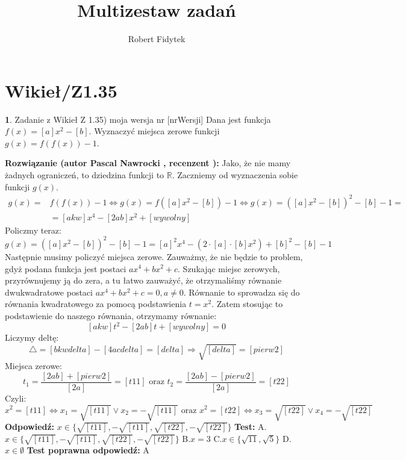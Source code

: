 \documentclass[12pt, a4paper]{article}
\title{Multizestaw zadań}
\author{Robert Fidytek}
\date{}
\theoremstyle{definition} %
\newtheorem{zad}{}
\newcommand{\kategoria}[1]{\section{#1}} %
\newcommand{\zadStart}[1]{\begin{zad}#1\newline} %
\newcommand{\zadStop}{\end{zad}}   %
\newcommand{\rozwStart}[2]{\noindent \textbf{Rozwiązanie (autor #1 , recenzent #2): }\newline} %
\newcommand{\rozwStop}{\newline}                                            %
\newcommand{\odpStart}{\noindent \textbf{Odpowiedź:}\newline}    %
\newcommand{\odpStop}{\newline}                                             %
\newcommand{\testStart}{\noindent \textbf{Test:}\newline} %
\newcommand{\testStop}{\newline} %
\newcommand{\kluczStart}{\noindent \textbf{Test poprawna odpowiedź:}\newline} %
\newcommand{\kluczStop}{\newline} %
\begin{document}
\maketitle


\kategoria{Wikieł/Z1.35}
\zadStart{Zadanie z Wikieł Z 1.35) moja wersja nr [nrWersji]}
Dana jest funkcja $f(x)=[a]x^2-[b]$.
Wyznaczyć miejsca zerowe funkcji \mbox{$g(x)=f(f(x))-1$}.
\zadStop
\rozwStart{Pascal Nawrocki}{}
Jako, że nie mamy żadnych ograniczeń, to dziedzina funkcji to $\mathbb{R}$.
Zaczniemy od wyznaczenia sobie funkcji $g(x)$.
\begin{equation}
\begin{split}
g(x)=&f(f(x))-1 \Leftrightarrow g(x)=f([a]x^2-[b])-1 \Leftrightarrow g(x)=([a]x^2-[b])^2-[b]-1=\\&=[akw]x^4-[2ab]x^2+[wywolny]
\end{split}
\end{equation}
Policzmy teraz:
$$ g(x)=([a]x^2-[b])^2-[b]-1=[a]^2x^4-(2\cdot[a]\cdot[b]x^2)+[b]^2-[b]-1$$
Następnie musimy policzyć miejsca zerowe. Zauważmy, że nie będzie to problem, gdyż podana funkcja jest postaci $ax^4+bx^2+c$. Szukając miejsc zerowych, przyrównujemy ją do zera, a tu łatwo zauważyć, że otrzymaliśmy równanie dwukwadratowe postaci $ax^4+bx^2+c=0, a\neq0$. Równanie to sprowadza się do równania kwadratowego za pomocą podstawienia $t=x^2$. Zatem stosując to podstawienie do naszego równania, otrzymamy równanie:
$$[akw]t^2-[2ab]t+[wywolny]=0$$
Liczymy deltę:
$$\bigtriangleup=[bkwdelta]-[4acdelta]=[delta]\Rightarrow\sqrt{[delta]}=[pierw2]$$
Miejsca zerowe:
$$t_1=\frac{[2ab]+[pierw2]}{[2a]}=[t11] \text{ oraz } t_2=\frac{[2ab]-[pierw2]}{[2a]}=[t22]$$
Czyli:
$$x^2={[t11]}\Leftrightarrow x_1=\sqrt{[t11]} \vee x_2=-\sqrt{[t11]} \text{ oraz } x^2=[t22]\Leftrightarrow x_3=\sqrt{[t22]} \vee x_4=-\sqrt{[t22]}$$
\rozwStop
\odpStart
$x\in\{\sqrt{[t11]},-\sqrt{[t11]},\sqrt{[t22]},-\sqrt{[t22]}\}$
\odpStop
\testStart
A.$x\in\{\sqrt{[t11]},-\sqrt{[t11]},\sqrt{[t22]},-\sqrt{[t22]}\}$
B.$x=3$
C.$x\in\{\sqrt{11},\sqrt{5}\}$
D.$x\in \emptyset$
\testStop
\kluczStart
A
\kluczStop
\end{document}
